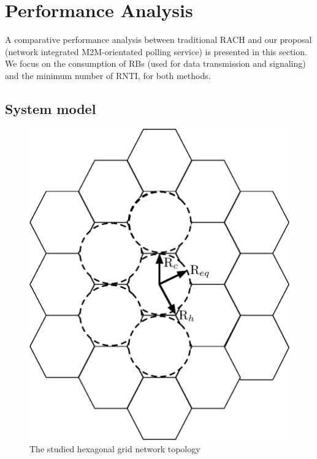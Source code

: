 \section{Performance Analysis}
\label{analysis}
A comparative performance analysis between traditional RACH and our proposal (network integrated M2M-orientated polling service) is presented in this section. We focus on the consumption of RBs  (used for data transmission and signaling) and the minimum number of RNTI, for both methods.

\subsection{System model}
\begin{figure}[!t]
	\centering
	\includegraphics[scale=0.5]{Chapter6/Figures/hexagone_grid}
	\caption{The studied hexagonal grid network topology}
	\label{fig:hexagone_grid}
\end{figure}

